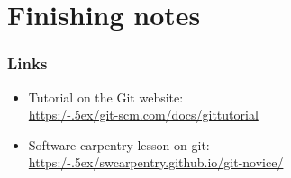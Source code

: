\documentclass[12pt]{beamer}
\begin{document}
\section{Finishing notes}

\begin{frame}
  \frametitle{Links}

  \begin{itemize}
    \item Tutorial on the Git website:\\
      \href{https://git-scm.com/docs/gittutorial}%
      {https:/\kern-.5ex/git-scm.com/docs/gittutorial}
    \item Software carpentry lesson on git:\\
      \href{https://swcarpentry.github.io/git-novice/}%
      {https:/\kern-.5ex/swcarpentry.github.io/git-novice/}
  \end{itemize}
\end{frame}
\end{document}
